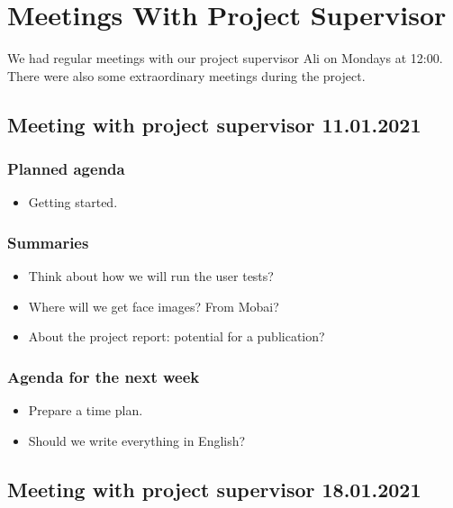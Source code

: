 \chapter{Meetings With Project Supervisor}
\label{appendix:supervisor}

We had regular meetings with our project supervisor Ali on Mondays at 12:00. There were also some extraordinary meetings during the project.


\section*{Meeting with project supervisor 11.01.2021}
\subsection*{Planned agenda}
\begin{itemize}
    \item Getting started.
\end{itemize}

\subsection*{Summaries}
\begin{itemize}
    \item Think about how we will run the user tests?
    \item Where will we get face images? From Mobai?
    \item About the project report: potential for a publication?
\end{itemize}

\subsection*{Agenda for the next week}
\begin{itemize}
    \item Prepare a time plan.
    \item Should we write everything in English?
\end{itemize}



\section*{Meeting with project supervisor 18.01.2021}
